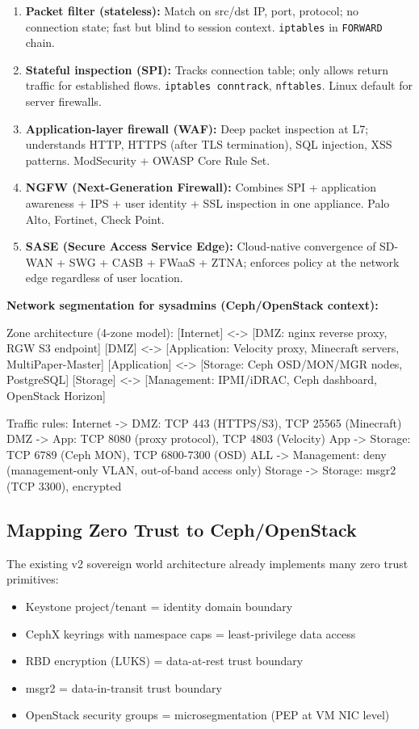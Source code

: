 \documentclass[11pt,letterpaper]{article}
\newenvironment{asciibox}{%
  \begin{tcolorbox}[colback=MidGray!8,colframe=MidGray!40,arc=2pt,left=6pt,right=6pt,top=4pt,bottom=4pt,breakable]
  \ttfamily\small
}{%
  \end{tcolorbox}
}
\begin{document}
\begin{enumerate}[noitemsep]
  \item \textbf{Packet filter (stateless):} Match on src/dst IP, port, protocol; no connection state; fast but blind to session context. \texttt{iptables} in \texttt{FORWARD} chain.
  \item \textbf{Stateful inspection (SPI):} Tracks connection table; only allows return traffic for established flows. \texttt{iptables conntrack}, \texttt{nftables}. Linux default for server firewalls.
  \item \textbf{Application-layer firewall (WAF):} Deep packet inspection at L7; understands HTTP, HTTPS (after TLS termination), SQL injection, XSS patterns. ModSecurity + OWASP Core Rule Set.
  \item \textbf{NGFW (Next-Generation Firewall):} Combines SPI + application awareness + IPS + user identity + SSL inspection in one appliance. Palo Alto, Fortinet, Check Point.
  \item \textbf{SASE (Secure Access Service Edge):} Cloud-native convergence of SD-WAN + SWG + CASB + FWaaS + ZTNA; enforces policy at the network edge regardless of user location.
\end{enumerate}

\textbf{Network segmentation for sysadmins (Ceph/OpenStack context):}
\begin{asciibox}
Zone architecture (4-zone model):
  [Internet] <-> [DMZ: nginx reverse proxy, RGW S3 endpoint]
  [DMZ] <-> [Application: Velocity proxy, Minecraft servers, MultiPaper-Master]
  [Application] <-> [Storage: Ceph OSD/MON/MGR nodes, PostgreSQL]
  [Storage] <-> [Management: IPMI/iDRAC, Ceph dashboard, OpenStack Horizon]

Traffic rules:
  Internet -> DMZ: TCP 443 (HTTPS/S3), TCP 25565 (Minecraft)
  DMZ -> App: TCP 8080 (proxy protocol), TCP 4803 (Velocity)
  App -> Storage: TCP 6789 (Ceph MON), TCP 6800-7300 (OSD)
  ALL -> Management: deny (management-only VLAN, out-of-band access only)
  Storage -> Storage: msgr2 (TCP 3300), encrypted
\end{asciibox}

\subsection{Mapping Zero Trust to Ceph/OpenStack}

The existing v2 sovereign world architecture already implements many zero trust primitives:
\begin{itemize}[noitemsep]
  \item Keystone project/tenant = identity domain boundary
  \item CephX keyrings with namespace caps = least-privilege data access
  \item RBD encryption (LUKS) = data-at-rest trust boundary
  \item msgr2 = data-in-transit trust boundary
  \item OpenStack security groups = microsegmentation (PEP at VM NIC level)
\end{itemize}
\end{document}
